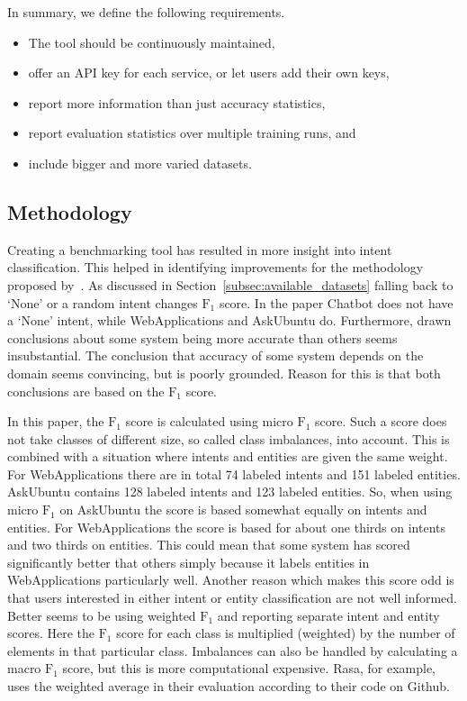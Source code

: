 In summary, we define the following requirements.
\begin{itemize}
    \item The tool should be continuously maintained,
    \item offer an API key for each service, or let users add their own keys,
    \item report more information than just accuracy statistics,
    \item report evaluation statistics over multiple training runs, \hspace*{3mm} and
    \item include bigger and more varied datasets.
\end{itemize}

\subsection{Methodology}
\label{subsec:methodology}
Creating a benchmarking tool has resulted in more insight into intent classification.
This helped in identifying improvements for the methodology proposed by~\citet{braun2017}.
As discussed in Section~\ref{subsec:available_datasets} falling back to `None' or a random intent changes $\text{F}_1$ score.
In the paper Chatbot does not have a `None' intent, while WebApplications and AskUbuntu do.
Furthermore, drawn conclusions about some system being more accurate than others seems insubstantial.
The conclusion that accuracy of some system depends on the domain seems convincing, but is poorly grounded.
Reason for this is that both conclusions are based on the $\text{F}_1$ score.

In this paper, the $\text{F}_1$ score is calculated using micro $\text{F}_1$ score.
Such a score does not take classes of different size, so called class imbalances, into account.
This is combined with a situation where intents and entities are given the same weight.
For WebApplications there are in total 74 labeled intents and 151 labeled entities.
AskUbuntu contains 128 labeled intents and 123 labeled entities.
So, when using micro $\text{F}_1$ on AskUbuntu the score is based somewhat equally on intents and entities.
For WebApplications the score is based for about one thirds on intents and two thirds on entities.
This could mean that some system has scored significantly better that others simply because it labels entities in WebApplications particularly well.
Another reason which makes this score odd is that users interested in either intent or entity classification are not well informed.
Better seems to be using weighted $\text{F}_1$ and reporting separate intent and entity scores.
Here the $\text{F}_1$ score for each class is multiplied (weighted) by the number of elements in that particular class.
Imbalances can also be handled by calculating a macro $\text{F}_1$ score, but this is more computational expensive.
Rasa, for example, uses the weighted average in their evaluation according to their code on Github.

